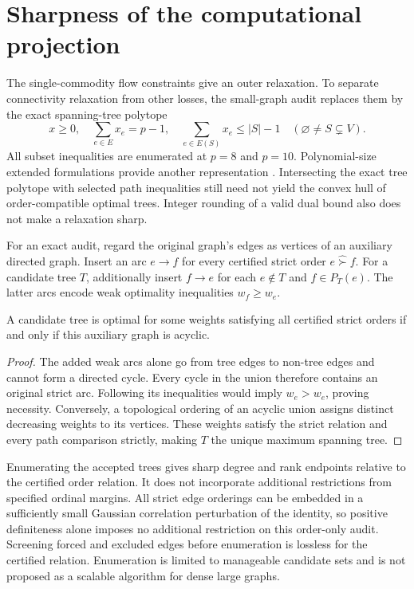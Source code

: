 \section{Sharpness of the computational projection}\label{sec:sharp}
The single-commodity flow constraints give an outer relaxation. To separate connectivity relaxation from other losses, the small-graph audit replaces them by the exact spanning-tree polytope
\[
 x\ge0,\quad \sum_{e\in E}x_e=p-1,\quad
 \sum_{e\in E(S)}x_e\le |S|-1\quad(\varnothing\ne S\subsetneq V).
\]
All subset inequalities are enumerated at $p=8$ and $p=10$. Polynomial-size extended formulations provide another representation \citep{martin1991}. Intersecting the exact tree polytope with selected path inequalities still need not yield the convex hull of order-compatible optimal trees. Integer rounding of a valid dual bound also does not make a relaxation sharp.

For an exact audit, regard the original graph's edges as vertices of an auxiliary directed graph. Insert an arc $e\to f$ for every certified strict order $e\widehat\succ f$. For a candidate tree $T$, additionally insert $f\to e$ for each $e\notin T$ and $f\in P_T(e)$. The latter arcs encode weak optimality inequalities $w_f\ge w_e$.

\begin{proposition}\label{prop:compatible}
A candidate tree is optimal for some weights satisfying all certified strict orders if and only if this auxiliary graph is acyclic.
\end{proposition}
\begin{proof}
The added weak arcs alone go from tree edges to non-tree edges and cannot form a directed cycle. Every cycle in the union therefore contains an original strict arc. Following its inequalities would imply $w_e>w_e$, proving necessity. Conversely, a topological ordering of an acyclic union assigns distinct decreasing weights to its vertices. These weights satisfy the strict relation and every path comparison strictly, making $T$ the unique maximum spanning tree.
\end{proof}

Enumerating the accepted trees gives sharp degree and rank endpoints relative to the certified order relation. It does not incorporate additional restrictions from specified ordinal margins. All strict edge orderings can be embedded in a sufficiently small Gaussian correlation perturbation of the identity, so positive definiteness alone imposes no additional restriction on this order-only audit. Screening forced and excluded edges before enumeration is lossless for the certified relation. Enumeration is limited to manageable candidate sets and is not proposed as a scalable algorithm for dense large graphs.

